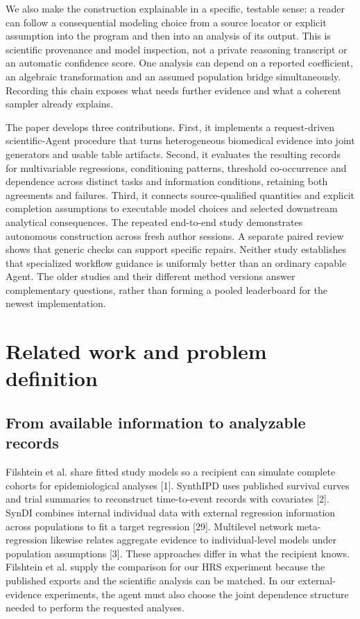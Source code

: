 \documentclass[11pt,letterpaper]{article}
\begin{document}
We also make the construction explainable in a specific, testable sense: a reader can follow a consequential modeling choice from a source locator or explicit assumption into the program and then into an analysis of its output. This is scientific provenance and model inspection, not a private reasoning transcript or an automatic confidence score. One analysis can depend on a reported coefficient, an algebraic transformation and an assumed population bridge simultaneously. Recording this chain exposes what needs further evidence and what a coherent sampler already explains.


The paper develops three contributions. First, it implements a request-driven scientific-Agent procedure that turns heterogeneous biomedical evidence into joint generators and usable table artifacts. Second, it evaluates the resulting records for multivariable regressions, conditioning patterns, threshold co-occurrence and dependence across distinct tasks and information conditions, retaining both agreements and failures. Third, it connects source-qualified quantities and explicit completion assumptions to executable model choices and selected downstream analytical consequences. The repeated end-to-end study demonstrates autonomous construction across fresh author sessions. A separate paired review shows that generic checks can support specific repairs. Neither study establishes that specialized workflow guidance is uniformly better than an ordinary capable Agent. The older studies and their different method versions answer complementary questions, rather than forming a pooled leaderboard for the newest implementation.


\section{Related work and problem definition}

\subsection{From available information to analyzable records}

Filshtein et al. share fitted study models so a recipient can simulate complete cohorts for epidemiological analyses [1]. SynthIPD uses published survival curves and trial summaries to reconstruct time-to-event records with covariates [2]. SynDI combines internal individual data with external regression information across populations to fit a target regression [29]. Multilevel network meta-regression likewise relates aggregate evidence to individual-level models under population assumptions [3]. These approaches differ in what the recipient knows. Filshtein et al. supply the comparison for our HRS experiment because the published exports and the scientific analysis can be matched. In our external-evidence experiments, the agent must also choose the joint dependence structure needed to perform the requested analyses.
\end{document}
